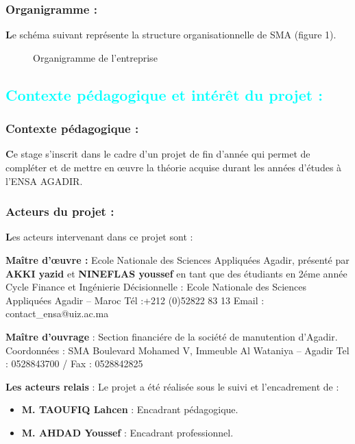 \documentclass[11pt]{article}
\begin{document}
 
\subsubsection{Organigramme :}
\textbf{ L}e schéma suivant représente la structure organisationnelle de SMA (figure 1).

\begin{figure}[h]
    \centering
     
    \caption{Organigramme de l'entreprise}
    \label{fig:monimag}
\end{figure}



\subsection{\textcolor{cyan}{Contexte pédagogique et intérêt du projet :}} 
\subsubsection{Contexte pédagogique :}
\textbf{C}e stage s’inscrit dans le cadre d’un projet de fin d’année qui permet de compléter et de mettre en œuvre la théorie acquise durant les années d’études à l’ENSA AGADIR.
\subsubsection{Acteurs du projet :}
\textbf{L}es acteurs intervenant dans ce projet sont : \vspace{0.5cm}

\textbf{Maître d’œuvre :} Ecole Nationale des Sciences Appliquées Agadir, présenté par \textbf{AKKI yazid}  et \textbf{NINEFLAS youssef} en tant que des étudiants en 2éme année Cycle Finance et Ingénierie Décisionnelle : Ecole Nationale des Sciences Appliquées Agadir – Maroc Tél :+212 (0)52822 83 13 Email : contact\_ensa@uiz.ac.ma \vspace{0.5cm}

\textbf{Maître d’ouvrage }: Section financiére	de la société de manutention d’Agadir.
Coordonnées : SMA Boulevard Mohamed V, Immeuble Al Wataniya – Agadir Tel : 0528843700 / Fax : 0528842825 \vspace{0.5cm}

\textbf{Les acteurs relais }: Le projet a été réalisée sous le suivi et l’encadrement de :
\begin{itemize}
    

\item \textbf{M. TAOUFIQ Lahcen }: Encadrant pédagogique.
 
\item \textbf{M. AHDAD Youssef} : Encadrant professionnel.
\end{itemize}
\end{document}
